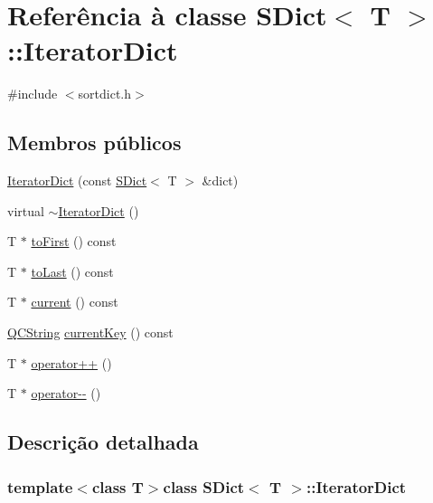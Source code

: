 \hypertarget{class_s_dict_1_1_iterator_dict}{\section{Referência à classe S\-Dict$<$ T $>$\-:\-:Iterator\-Dict}
\label{class_s_dict_1_1_iterator_dict}
}


{\ttfamily \#include $<$sortdict.\-h$>$}

\subsection*{Membros públicos}
\begin{DoxyCompactItemize}
\item 
\hyperlink{class_s_dict_1_1_iterator_dict_acd1d836184c2f293a9c063ea514ef0da}{Iterator\-Dict} (const \hyperlink{class_s_dict}{S\-Dict}$<$ T $>$ \&dict)
\item 
virtual \hyperlink{class_s_dict_1_1_iterator_dict_a324edae396b1a9728b0fe0c61b4ae750}{$\sim$\-Iterator\-Dict} ()
\item 
T $\ast$ \hyperlink{class_s_dict_1_1_iterator_dict_ade77b001f496006e7017c1ec8620aeb3}{to\-First} () const 
\item 
T $\ast$ \hyperlink{class_s_dict_1_1_iterator_dict_a72d0e5c78c00ed44b21f29f12ae487e0}{to\-Last} () const 
\item 
T $\ast$ \hyperlink{class_s_dict_1_1_iterator_dict_ae616144a9897ce6137bce90597583bab}{current} () const 
\item 
\hyperlink{class_q_c_string}{Q\-C\-String} \hyperlink{class_s_dict_1_1_iterator_dict_a41f42dd5584886e768f693e8b60b3bd0}{current\-Key} () const 
\item 
T $\ast$ \hyperlink{class_s_dict_1_1_iterator_dict_a47eb98449264b3d96cf72c29fa3e9049}{operator++} ()
\item 
T $\ast$ \hyperlink{class_s_dict_1_1_iterator_dict_af941a0327bceddd0cbce3539c100d54d}{operator-\/-\/} ()
\end{DoxyCompactItemize}


\subsection{Descrição detalhada}
\subsubsection*{template$<$class T$>$class S\-Dict$<$ T $>$\-::\-Iterator\-Dict}

